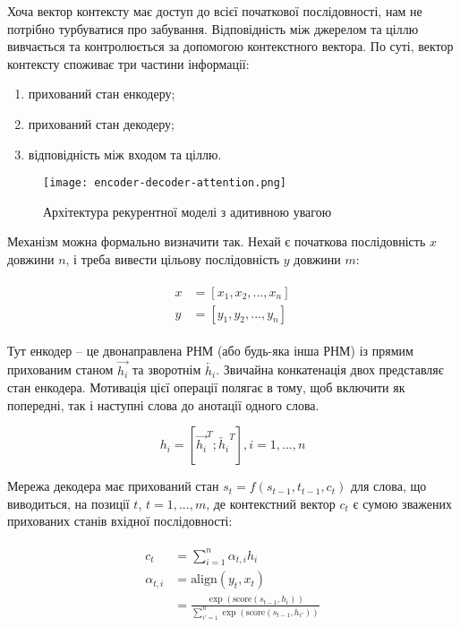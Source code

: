 Хоча вектор контексту має доступ до всієї початкової послідовності,
нам не потрібно турбуватися про забування.
Відповідність між джерелом та ціллю вивчається та контролюється
за допомогою контекстного вектора. По суті, вектор контексту
споживає три частини інформації:

\begin{enumerate}[label=--]
    \item прихований стан енкодеру;
    \item прихований стан декодеру;
    \item відповідність між входом та ціллю.
\end{enumerate}

\begin{figure}[H]
    \centering
    \texttt{[image: encoder-decoder-attention.png]}
    \caption{Архітектура рекурентної моделі з адитивною увагою}
    \label{fig:plot3}
\end{figure}

Механізм можна формально визначити так. Нехай є початкова послідовність
$x$ довжини $n$, і треба вивести цільову послідовність $y$
довжини $m$:

\vspace{0.5em}
\begin{gather}
\begin{aligned}
    x &= [x_1,x_2, ..., x_n] \\
    y &= [y_1,y_2, ..., y_n]
\end{aligned}
\end{gather}
\vspace{\baselineskip}

Тут енкодер -- це двонаправлена РНМ (або будь-яка інша РНМ) із прямим
прихованим станом $\overrightarrow{h_i}$ та зворотнім
$\overleftarrow{h_i}$. Звичайна конкатенація двох представляє стан
енкодера. Мотивація цієї операції
полягає в тому, щоб включити як попередні, так і наступні
слова до анотації одного слова.

\begin{equation}
    h_i = [\overrightarrow{h_i}^T;\overleftarrow{h_i}^T], i=1, ..., n
\end{equation}

Мережа декодера має прихований стан $s_t = f(s_{t-1},t_{t-1},c_t)$
для слова, що виводиться, на позиції $t$, $t = 1, ..., m$,
де контекстний вектор $c_t$ є сумою зважених прихованих станів
вхідної послідовності:

\vspace{0.5em}
\begin{gather}
\begin{aligned}
    c_t          &= \sum^n_{i=1}\alpha_{t,i} h_i \\
    \alpha_{t,i} &= \text{align}(y_t,x_t) \\
    &= \frac{\exp(\text{score}(s_{t-1}, h_i))}{\sum^n_{i'=1}\exp(\text{score}(s_{t-1},h_{i'}))}
\end{aligned}
\end{gather}
\vspace{\baselineskip}

